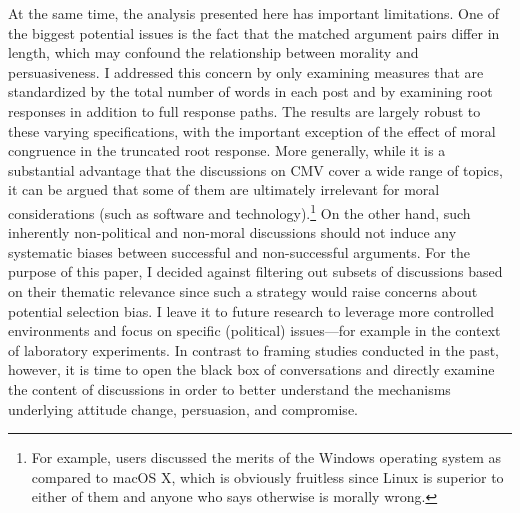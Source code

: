 At the same time, the analysis presented here has important limitations. One of the biggest potential issues is the fact that the matched argument pairs differ in length, which may confound the relationship between morality and persuasiveness. I addressed this concern by only examining measures that are standardized by the total number of words in each post and by examining root responses in addition to full response paths. The results are largely robust to these varying specifications, with the important exception of the effect of moral congruence in the truncated root response. More generally, while it is a substantial advantage that the discussions on CMV cover a wide range of topics, it can be argued that some of them are ultimately irrelevant for moral considerations (such as software and technology).\footnote{For example, users discussed the merits of the Windows operating system as compared to macOS X, which is obviously fruitless since Linux is superior to either of them and anyone who says otherwise is morally wrong.} On the other hand, such inherently non-political and non-moral discussions should not induce any systematic biases between successful and non-successful arguments. For the purpose of this paper, I decided against filtering out subsets of discussions based on their thematic relevance since such a strategy would raise concerns about potential selection bias. I leave it to future research to leverage more controlled environments and focus on specific (political) issues---for example in the context of laboratory experiments. In contrast to framing studies conducted in the past, however, it is time to open the black box of conversations and directly examine the content of discussions in order to better understand the mechanisms underlying attitude change, persuasion, and compromise.




